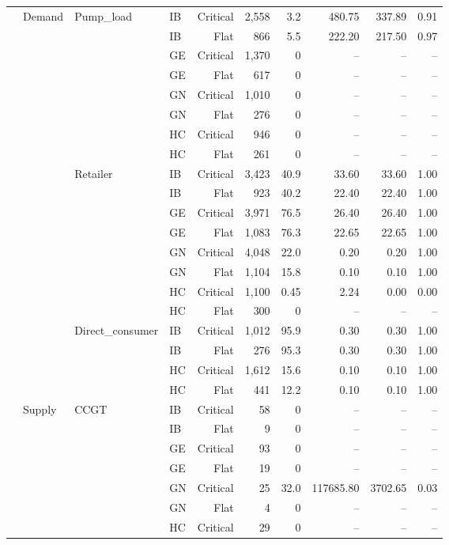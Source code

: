 \begin{longtable}{@{}l l l l r r r r r r@{}}
\midrule
 & Demand & Pump\_load & IB & Critical & 2,558 & 3.2 & 480.75 & 337.89 & 0.91 \\
 &  &  & IB & Flat & 866 & 5.5 & 222.20 & 217.50 & 0.97 \\
 &  &  & GE & Critical & 1,370 & 0 & -- & -- & -- \\
 &  &  & GE & Flat & 617 & 0 & -- & -- & -- \\
 &  &  & GN & Critical & 1,010 & 0 & -- & -- & -- \\
 &  &  & GN & Flat & 276 & 0 & -- & -- & -- \\
 &  &  & HC & Critical & 946 & 0 & -- & -- & -- \\
 &  &  & HC & Flat & 261 & 0 & -- & -- & -- \\
\addlinespace
 &  & Retailer & IB & Critical & 3,423 & 40.9 & 33.60 & 33.60 & 1.00 \\
 &  &  & IB & Flat & 923 & 40.2 & 22.40 & 22.40 & 1.00 \\
 &  &  & GE & Critical & 3,971 & 76.5 & 26.40 & 26.40 & 1.00 \\
 &  &  & GE & Flat & 1,083 & 76.3 & 22.65 & 22.65 & 1.00 \\
 &  &  & GN & Critical & 4,048 & 22.0 & 0.20 & 0.20 & 1.00 \\
 &  &  & GN & Flat & 1,104 & 15.8 & 0.10 & 0.10 & 1.00 \\
 &  &  & HC & Critical & 1,100 & 0.45 & 2.24 & 0.00 & 0.00 \\
 &  &  & HC & Flat & 300 & 0 & -- & -- & -- \\
\addlinespace
 &  & Direct\_consumer & IB & Critical & 1,012 & 95.9 & 0.30 & 0.30 & 1.00 \\
 &  &  & IB & Flat & 276 & 95.3 & 0.30 & 0.30 & 1.00 \\
 &  &  & HC & Critical & 1,612 & 15.6 & 0.10 & 0.10 & 1.00 \\
 &  &  & HC & Flat & 441 & 12.2 & 0.10 & 0.10 & 1.00 \\
\midrule
 & Supply & CCGT & IB & Critical & 58 & 0 & -- & -- & -- \\
 &  &  & IB & Flat & 9 & 0 & -- & -- & -- \\
 &  &  & GE & Critical & 93 & 0 & -- & -- & -- \\
 &  &  & GE & Flat & 19 & 0 & -- & -- & -- \\
 &  &  & GN & Critical & 25 & 32.0 & 117685.80 & 3702.65 & 0.03 \\
 &  &  & GN & Flat & 4 & 0 & -- & -- & -- \\
 &  &  & HC & Critical & 29 & 0 & -- & -- & -- \\

\end{longtable}
